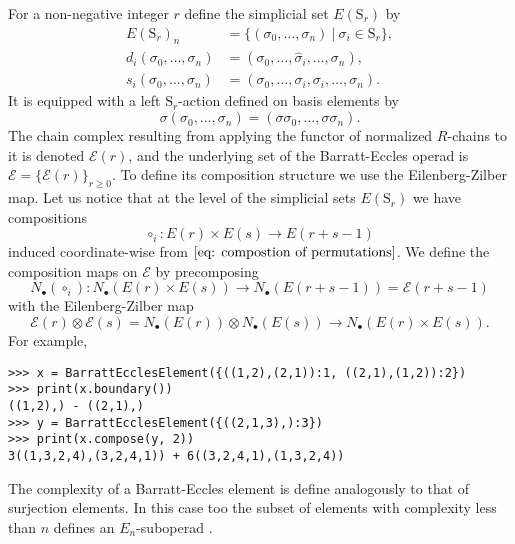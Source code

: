 \documentclass{amsart}
\renewcommand{\S}{\mathrm S}
\begin{document}
For a non-negative integer $r$ define the simplicial set $E(\mathrm S_r)$ by
\begin{align*}
E(\mathrm S_r)_n &= \{ (\sigma_0, \dots, \sigma_n)\ |\ \sigma_i \in \mathrm{S}_r\}, \\
d_i(\sigma_0, \dots, \sigma_n) &= (\sigma_0, \dots, \widehat{\sigma}_i, \dots, \sigma_n), \\
s_i(\sigma_0, \dots, \sigma_n) &= (\sigma_0, \dots, \sigma_i, \sigma_i, \dots, \sigma_n).
\end{align*}
It is equipped with a left $\mathrm S_r$-action defined on basis elements by
\begin{equation*}
\sigma (\sigma_0, \dots, \sigma_n) = (\sigma \sigma_0, \dots, \sigma \sigma_n).
\end{equation*}
The chain complex resulting from applying the functor of normalized $R$-chains to it is denoted $\mathcal E(r)$, and the underlying set of the Barratt-Eccles operad is $\mathcal E = \{\mathcal E(r)\}_{r\geq0}$. To define its composition structure we use the Eilenberg-Zilber map. Let us notice that at the level of the simplicial sets $E(\S_r)$ we have compositions
\begin{equation*}
{\circ}_{i}: E(r) \times E(s) \to E(r + s - 1)
\end{equation*}
induced coordinate-wise from $\eqref{eq: compostion of permutations}$.
We define the composition maps on $\mathcal E$ by precomposing
\begin{equation*}
N_\bullet(\circ_i) \colon N_\bullet(E(r) \times E(s))
\longrightarrow
N_\bullet(E(r + s - 1)) = \mathcal E(r+s-1)
\end{equation*}
with the Eilenberg-Zilber map
\begin{equation*}
\mathcal E(r) \otimes \mathcal E(s) =
N_\bullet(E(r)) \otimes N_\bullet(E(s))
\longrightarrow
N_\bullet(E(r) \times E(s)).
\end{equation*}
For example,
\begin{Verbatim}[frame=single, samepage=true]
>>> x = BarrattEcclesElement({((1,2),(2,1)):1, ((2,1),(1,2)):2})
>>> print(x.boundary())
((1,2),) - ((2,1),)
>>> y = BarrattEcclesElement({((2,1,3),):3})
>>> print(x.compose(y, 2))
3((1,3,2,4),(3,2,4,1)) + 6((3,2,4,1),(1,3,2,4))
\end{Verbatim}

The complexity of a Barratt-Eccles element is define analogously to that of surjection elements. In this case too the subset of elements with complexity less than $n$ defines an $E_n$-suboperad \cite{BergerFresse04}.
\end{document}
